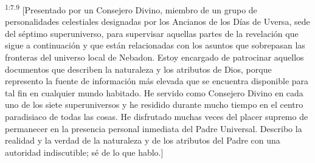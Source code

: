 \par
\textsuperscript{1:7.9} [Presentado por un Consejero Divino, miembro de un grupo de personalidades celestiales designadas por los Ancianos de los Días de Uversa, sede del séptimo superuniverso, para supervisar aquellas partes de la revelación que sigue a continuación y que están relacionadas con los asuntos que sobrepasan las fronteras del universo local de Nebadon. Estoy encargado de patrocinar aquellos documentos que describen la naturaleza y los atributos de Dios, porque represento la fuente de información más elevada que se encuentra disponible para tal fin en cualquier mundo habitado. He servido como Consejero Divino en cada uno de los siete superuniversos y he residido durante mucho tiempo en el centro paradisiaco de todas las cosas. He disfrutado muchas veces del placer supremo de permanecer en la presencia personal inmediata del Padre Universal. Describo la realidad y la verdad de la naturaleza y de los atributos del Padre con una autoridad indiscutible; sé de lo que hablo.]